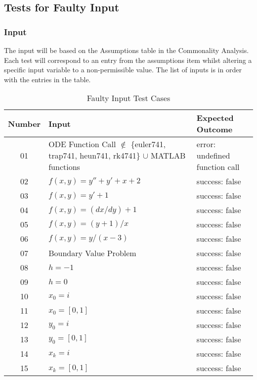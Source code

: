 \documentclass[12pt, titlepage]{article}
\begin{document}
\subsection{Tests for Faulty Input}

\subsubsection{Input}
		
The input will be based on the Assumptions table in the Commonality Analysis. Each test will correspond to an 
entry from the assumptions item whilst altering a specific input variable to a non-permissible value. The list of 
inputs is in order with the entries in the table.

\begin{table} [H]
  \caption{Faulty Input Test Cases}
  \label{Table:Table_FaultyInputs}  
\begin{tabular}{|c|p{8cm}|p{6cm}|}
  \hline	
  \textbf{Number} & \textbf{Input} &\textbf{Expected Outcome}\\
  \hline 
  01 & ODE Function Call $\mathbb{\notin}$ \{euler741, trap741, heun741, rk4741\} $\mathbb{\cup}$ 
  MATLAB functions & error: undefined function call\\ \hline
  02& $f(x, y) = y'' + y' + x + 2$ & success: false\\ \hline
  03& $f(x, y) = y' + 1$ & success: false\\ \hline
  04& $f(x, y) = (dx/dy) + 1$ & success: false\\ \hline
  05& $f(x, y) = (y + 1) / x$ & success: false\\ \hline
  06& $f(x, y) = y/(x-3)$ & success: false\\ \hline
  07& Boundary Value Problem & success: false\\ \hline
  08& $h = -1$ & success: false\\ \hline
  09& $h = 0$ & success: false\\ \hline
  10& $x_0 = i$ & success: false\\ \hline 
  11& $x_0 = [0, 1]$ & success: false\\ \hline 
  12& $y_0 = i$ & success: false\\ \hline 
  13& $y_0 = [0, 1]$ & success: false\\ \hline
  14& $x_k = i$ & success: false\\ \hline 
  15& $x_k = [0, 1]$ & success: false\\ \hline

\end{tabular}\\
\end{table}
\end{document}
